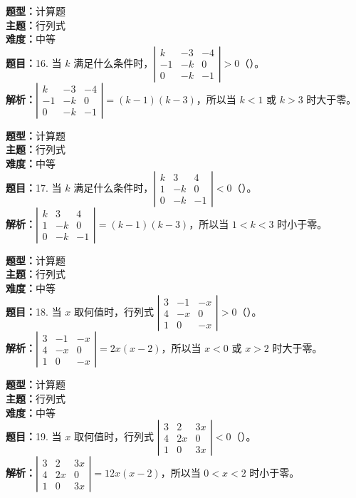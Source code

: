 \documentclass{ctexart}
\newenvironment{question}[5]{%
	\noindent\textbf{题型：}#1\\
	\textbf{主题：}#2\\
	\textbf{难度：}#3\\
	\textbf{题目：}#4\\
	\textbf{解析：}#5\\
	\vspace{1em}
}{}
\begin{document}
\begin{question} 
	{计算题} 
	{行列式}
	{中等}
	{16. 当 $k$ 满足什么条件时，$\left|\begin{array}{ccc}k & -3 & -4 \\ -1 & -k & 0 \\ 0 & -k & -1\end{array}\right|>0$（）。}
	{$\left|\begin{array}{ccc}k & -3 & -4 \\ -1 & -k & 0 \\ 0 & -k & -1\end{array}\right| = (k - 1)(k - 3)$，所以当 $k < 1$ 或 $k > 3$ 时大于零。}
\end{question}

\begin{question} 
	{计算题} 
	{行列式}
	{中等}
	{17. 当 $k$ 满足什么条件时，$\left|\begin{array}{ccc}k & 3 & 4 \\ 1 & -k & 0 \\ 0 & -k & -1\end{array}\right|<0$（）。}
	{$\left|\begin{array}{ccc}k & 3 & 4 \\ 1 & -k & 0 \\ 0 & -k & -1\end{array}\right| = (k - 1)(k - 3)$，所以当 $1 < k < 3$ 时小于零。}
\end{question}

\begin{question} 
	{计算题} 
	{行列式}
	{中等}
	{18. 当 $x$ 取何值时，行列式 $\left|\begin{array}{ccc}3 & -1 & -x \\ 4 & -x & 0 \\ 1 & 0 & -x\end{array}\right|>0$（）。}
	{$\left|\begin{array}{ccc}3 & -1 & -x \\ 4 & -x & 0 \\ 1 & 0 & -x\end{array}\right| = 2x(x - 2)$，所以当 $x < 0$ 或 $x > 2$ 时大于零。}
\end{question}

\begin{question} 
	{计算题} 
	{行列式}
	{中等}
	{19. 当 $x$ 取何值时，行列式 $\left|\begin{array}{ccc}3 & 2 & 3x \\ 4 & 2x & 0 \\ 1 & 0 & 3x\end{array}\right|<0$（）。}
	{$\left|\begin{array}{ccc}3 & 2 & 3x \\ 4 & 2x & 0 \\ 1 & 0 & 3x\end{array}\right| = 12x(x - 2)$，所以当 $0 < x < 2$ 时小于零。}
\end{question}
\end{document}
